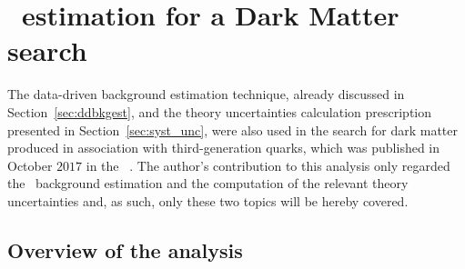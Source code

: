 \chapter{\ttZ\ estimation for a Dark Matter search}
\label{app:ttzdm}

	The data-driven background estimation technique, already discussed in Section~\ref{sec:ddbkgest}, and the theory uncertainties calculation prescription presented in Section~\ref{sec:syst_unc}, were also used in the search for dark matter produced in association with third-generation quarks, which was published in October $2017$ in the \EPJ~\cite{DMhf}. The author's contribution to this analysis only regarded the \ttZ\ background estimation and the computation of the relevant theory uncertainties and, as such, only these two topics will be hereby covered.


	\section{Overview of the analysis}

